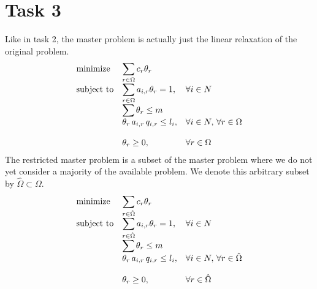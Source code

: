 \documentclass{article}
\begin{document}
    \section*{Task 3}
    Like in task 2, the master problem is actually just the linear relaxation of the original problem.
    \begin{equation*}
        \begin{array}{ll@{}ll}
            \text{minimize}  & \displaystyle\sum_{r \in \Omega} c_r \theta_r& &\\
            \text{subject to}& \displaystyle\sum_{r \in \Omega} a_{i, r} \theta_r = 1 ,&   &\forall i \in N\\
            & \displaystyle\sum \theta_r \leq m &&\\
            & \displaystyle\theta_r \, a_{i,r} \, q_{i,r} \leq l_i, & & \forall i \in N, \, \forall r \in \Omega\\\\
            & \displaystyle \theta_r  \geq 0,  && \forall r \in \Omega
        \end{array}
    \end{equation*}
    The restricted master problem is a subset of the master problem where we do not yet consider a majority of the available problem.
    We denote this arbitrary subset by $\hat{\Omega} \subset \Omega$.
    \begin{equation*}
        \begin{array}{ll@{}ll}
            \text{minimize}  & \displaystyle\sum_{r \in \hat{\Omega}} c_r \theta_r& &\\
            \text{subject to}& \displaystyle\sum_{r \in \hat{\Omega}} a_{i, r} \theta_r = 1 ,&   &\forall i \in N\\
            & \displaystyle\sum \theta_r \leq m &&\\
            & \displaystyle\theta_r \, a_{i,r} \, q_{i,r} \leq l_i, & & \forall i \in N, \, \forall r \in \hat{\Omega}\\\\
            & \displaystyle \theta_r  \geq 0,  && \forall r \in \hat{\Omega}
        \end{array}
    \end{equation*}
\end{document}
